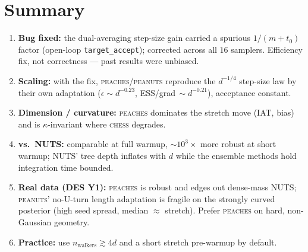 \documentclass[11pt]{article}
\begin{document}
\section{Summary}
\begin{enumerate}\setlength\itemsep{2pt}
\item \textbf{Bug fixed:} the dual-averaging step-size gain carried a spurious
$1/(m{+}t_0)$ factor (open-loop \texttt{target\_accept}); corrected across all
$16$ samplers. Efficiency fix, not correctness --- past results were unbiased.
\item \textbf{Scaling:} with the fix, \textsc{peaches}/\textsc{peanuts}
reproduce the $d^{-1/4}$ step-size law by their own adaptation
($\epsilon\!\sim\!d^{-0.23}$, ESS/grad$\,\sim\!d^{-0.21}$), acceptance constant.
\item \textbf{Dimension / curvature:} \textsc{peaches} dominates the stretch
move (IAT, bias) and is $\kappa$-invariant where \textsc{chess} degrades.
\item \textbf{vs.\ NUTS:} comparable at full warmup, $\sim\!10^{3}\times$ more
robust at short warmup; NUTS' tree depth inflates with $d$ while the ensemble
methods hold integration time bounded.
\item \textbf{Real data (DES Y1):} \textsc{peaches} is robust and edges out
dense-mass NUTS; \textsc{peanuts}' no-U-turn length adaptation is fragile on
the strongly curved posterior (high seed spread, median $\approx$ stretch).
Prefer \textsc{peaches} on hard, non-Gaussian geometry.
\item \textbf{Practice:} use $n_{\text{walkers}}\!\gtrsim\!4d$ and a short
stretch pre-warmup by default.
\end{enumerate}
\end{document}
